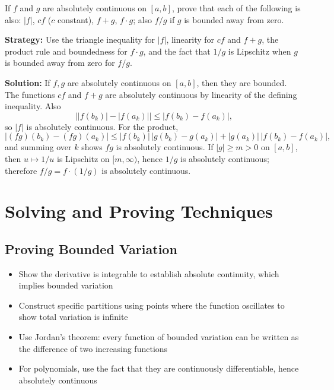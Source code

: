 \begin{problembox}
\begin{problemstatement}
If $f$ and $g$ are absolutely continuous on $[a, b]$, prove that each of the following is also: $|f|$, $cf$ ($c$ constant), $f + g$, $f \cdot g$; also $f/g$ if $g$ is bounded away from zero.
\end{problemstatement}
\end{problembox}

\noindent\textbf{Strategy:} Use the triangle inequality for $|f|$, linearity for $cf$ and $f+g$, the product rule and boundedness for $f \cdot g$, and the fact that $1/g$ is Lipschitz when $g$ is bounded away from zero for $f/g$.

\bigskip\noindent\textbf{Solution:}
If $f,g$ are absolutely continuous on $[a,b]$, then they are bounded. The functions $cf$ and $f+g$ are absolutely continuous by linearity of the defining inequality. Also
\[\big||f(b_k)|-|f(a_k)|\big|\le |f(b_k)-f(a_k)|,\]
so $|f|$ is absolutely continuous. For the product,
\[|(fg)(b_k)-(fg)(a_k)|\le |f(b_k)|\,|g(b_k)-g(a_k)|+|g(a_k)|\,|f(b_k)-f(a_k)|,\]
and summing over $k$ shows $fg$ is absolutely continuous. If $|g|\ge m>0$ on $[a,b]$, then $u\mapsto 1/u$ is Lipschitz on $[m,\infty)$, hence $1/g$ is absolutely continuous; therefore $f/g=f\cdot(1/g)$ is absolutely continuous.

\section{Solving and Proving Techniques}

\subsection*{Proving Bounded Variation}
\begin{itemize}
\item Show the derivative is integrable to establish absolute continuity, which implies bounded variation
\item Construct specific partitions using points where the function oscillates to show total variation is infinite
\item Use Jordan's theorem: every function of bounded variation can be written as the difference of two increasing functions
\item For polynomials, use the fact that they are continuously differentiable, hence absolutely continuous
\end{itemize}

